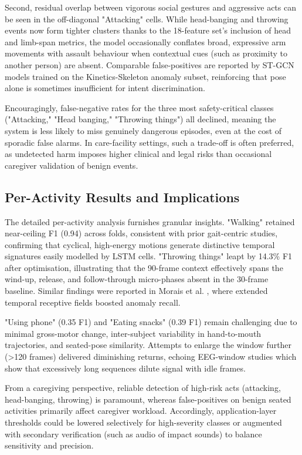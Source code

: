 \documentclass{iopconfser}
\begin{document}
Second, residual overlap between vigorous social gestures and aggressive acts can be seen in the off-diagonal "Attacking" cells. While head-banging and throwing events now form tighter clusters thanks to the 18-feature set's inclusion of head and limb-span metrics, the model occasionally conflates broad, expressive arm movements with assault behaviour when contextual cues (such as proximity to another person) are absent. Comparable false-positives are reported by ST-GCN models trained on the Kinetics-Skeleton anomaly subset, reinforcing that pose alone is sometimes insufficient for intent discrimination.

Encouragingly, false-negative rates for the three most safety-critical classes ("Attacking," "Head banging," "Throwing things") all declined, meaning the system is less likely to miss genuinely dangerous episodes, even at the cost of sporadic false alarms. In care-facility settings, such a trade-off is often preferred, as undetected harm imposes higher clinical and legal risks than occasional caregiver validation of benign events.

\subsection{Per-Activity Results and Implications}

The detailed per-activity analysis furnishes granular insights. "Walking" retained near-ceiling F1 (0.94) across folds, consistent with prior gait-centric studies, confirming that cyclical, high-energy motions generate distinctive temporal signatures easily modelled by LSTM cells. "Throwing things" leapt by 14.3\% F1 after optimisation, illustrating that the 90-frame context effectively spans the wind-up, release, and follow-through micro-phases absent in the 30-frame baseline. Similar findings were reported in Morais et al. \cite{morais2019learning}, where extended temporal receptive fields boosted anomaly recall.

"Using phone" (0.35 F1) and "Eating snacks" (0.39 F1) remain challenging due to minimal gross-motor change, inter-subject variability in hand-to-mouth trajectories, and seated-pose similarity. Attempts to enlarge the window further (>120 frames) delivered diminishing returns, echoing EEG-window studies which show that excessively long sequences dilute signal with idle frames.

From a caregiving perspective, reliable detection of high-risk acts (attacking, head-banging, throwing) is paramount, whereas false-positives on benign seated activities primarily affect caregiver workload. Accordingly, application-layer thresholds could be lowered selectively for high-severity classes or augmented with secondary verification (such as audio of impact sounds) to balance sensitivity and precision.
\end{document}
